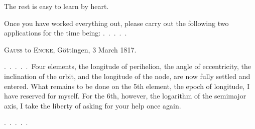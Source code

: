 \begin{landscape}
\begin{center}
\end{center}
\par\noindent The rest is easy to learn by heart.
\par\noindent\hspace*{\parindent}Once you have worked everything out, please carry out the following
two applications for the time being: .\ .\ .\ .\ .
\par\medskip
\begin{center}\textsc{Gauss} to \textsc{Encke}, Göttingen, 3 March 1817.\end{center}
\par\noindent\hspace*{\parindent}.\ .\ .\ .\ .\ Four elements, the longitude of perihelion, the angle of eccentricity, the inclination
of the orbit, and the longitude of the node, are now fully settled and entered. What remains to be done on the 5th element, the epoch of longitude,
I have reserved for myself. For the 6th, however, the logarithm
of the semimajor axis, I take the liberty of asking for your help once again.
\par\noindent .\ .\ .\ .\ .
\clearpage
\endgroup
\end{landscape}
